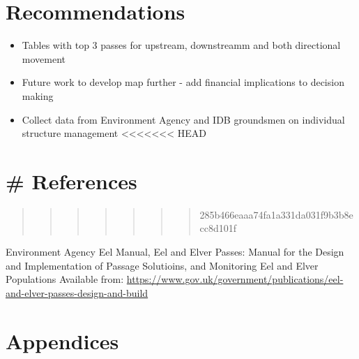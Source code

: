 \documentclass[]{article}
\providecommand{\tightlist}{%
  \setlength{\itemsep}{0pt}\setlength{\parskip}{0pt}}
\begin{document}
\hypertarget{recommendations}{%
\section{Recommendations}\label{recommendations}}

\begin{itemize}
\tightlist
\item
  Tables with top 3 passes for upstream, downstreamm and both
  directional movement
\item
  Future work to develop map further - add financial implications to
  decision making
\item
  Collect data from Environment Agency and IDB groundsmen on individual
  structure management
  \textless{}\textless{}\textless{}\textless{}\textless{}\textless{}\textless{}
  HEAD
\end{itemize}

\hypertarget{references}{%
\section{\# References}\label{references}}

\begin{quote}
\begin{quote}
\begin{quote}
\begin{quote}
\begin{quote}
\begin{quote}
\begin{quote}
285b466eaaa74fa1a331da031f9b3b8ecc8d101f
\end{quote}
\end{quote}
\end{quote}
\end{quote}
\end{quote}
\end{quote}
\end{quote}

Environment Agency Eel Manual, Eel and Elver Passes: Manual for the
Design and Implementation of Passage Solutioins, and Monitoring Eel and
Elver Populations Available from:
\url{https://www.gov.uk/government/publications/eel-and-elver-passes-design-and-build}

\hypertarget{appendices}{%
\section{Appendices}\label{appendices}}
\end{document}
